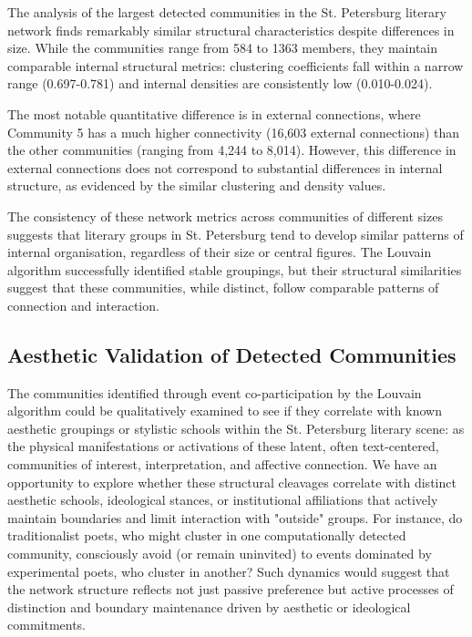 \documentclass{jcls}
\begin{document}
The analysis of the largest detected communities in the St. Petersburg literary network finds remarkably similar structural characteristics despite differences in size. While the communities range from 584 to 1363 members, they maintain comparable internal structural metrics: clustering coefficients fall within a narrow range (0.697-0.781) and internal densities are consistently low (0.010-0.024).

The most notable quantitative difference is in external connections, where Community 5 has a much higher connectivity (16,603 external connections) than the other communities (ranging from 4,244 to 8,014). However, this difference in external connections does not correspond to substantial differences in internal structure, as evidenced by the similar clustering and density values.

The consistency of these network metrics across communities of different sizes suggests that literary groups in St. Petersburg tend to develop similar patterns of internal organisation, regardless of their size or central figures. The Louvain algorithm successfully identified stable groupings, but their structural similarities suggest that these communities, while distinct, follow comparable patterns of connection and interaction.

\subsection{Aesthetic Validation of Detected Communities}
The communities identified through event co-participation by the Louvain algorithm could be qualitatively examined to see if they correlate with known aesthetic groupings or stylistic schools within the St. Petersburg literary scene: as the physical manifestations or activations of these latent, often text-centered, communities of interest, interpretation, and affective connection. We have an opportunity to explore whether these structural cleavages correlate with distinct aesthetic schools, ideological stances, or institutional affiliations that actively maintain boundaries and limit interaction with "outside" groups. For instance, do traditionalist poets, who might cluster in one computationally detected community, consciously avoid (or remain uninvited) to events dominated by experimental poets, who cluster in another? Such dynamics would suggest that the network structure reflects not just passive preference but active processes of distinction and boundary maintenance driven by aesthetic or ideological commitments.
\end{document}
